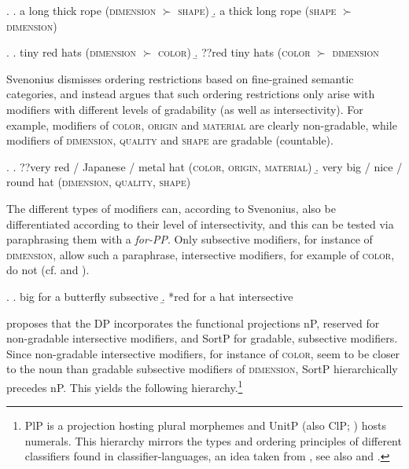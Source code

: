 \documentclass [output=book,colorlinks,citecolor=brown]{langscibook}
\begin{document}
\ex. \label{longthick} \a. a long thick rope (\textsc{dimension} $\succ$ \textsc{shape})
\b. a thick long rope (\textsc{shape} $\succ$ \textsc{dimension}) \null \hfill\citep[37]{svenonius:2008:position}

\ex. \label{tinyred} \a. tiny red hats (\textsc{dimension} $\succ$ \textsc{color})
\b. ??red tiny hats (\textsc{color} $\succ$ \textsc{dimension} \null \hfill\citep[36]{svenonius:2008:position}

Svenonius dismisses ordering restrictions based on fine-grained semantic categories, and instead argues that such ordering restrictions only arise with modifiers with different levels of gradability (as well as intersectivity). For example, modifiers of \textsc{color}, \textsc{origin} and \textsc{material} are clearly non-gradable, while modifiers of \textsc{dimension}, \textsc{quality} and \textsc{shape} are gradable (countable).

\ex. \a. ??very red / Japanese / metal hat (\textsc{color}, \textsc{origin}, \textsc{material})
\b. very big / nice / round hat (\textsc{dimension}, \textsc{quality}, \textsc{shape})

The different types of modifiers can, according to Svenonius, also be differentiated according to their level of intersectivity, and this can be tested via paraphrasing them with a \textit{for-PP}. Only subsective modifiers, for instance of \textsc{dimension}, allow such a paraphrase, intersective modifiers, for example of \textsc{color}, do not (cf. \citealt{mckinney:2011:adj} and \citealt{cinque:2014:semantics}).

\ex. \a. big for a butterfly \null \hfill subsective
\b. *red for a hat \null \hfill intersective

\citet[sec. 4.3]{svenonius:2008:position} proposes that the DP incorporates the functional projections nP, reserved for non-gradable intersective modifiers, and SortP for gradable, subsective modifiers. Since non-gradable intersective modifiers, for instance of \textsc{color}, seem to be closer to the noun than gradable subsective modifiers of \textsc{dimension}, SortP hierarchically precedes nP. This yields the following hierarchy.\footnote{PlP is a projection hosting plural morphemes and UnitP (also ClP; \citealt{svenonius:2022:span}) hosts numerals. This hierarchy mirrors the types and ordering principles of different classifiers found in classifier-languages, an idea taken from \citet{borer:2005:in}, see also \citet{rijkhoff:2002:noun} and \citet{zamparelli:2000:layers}.} %
\end{document}
